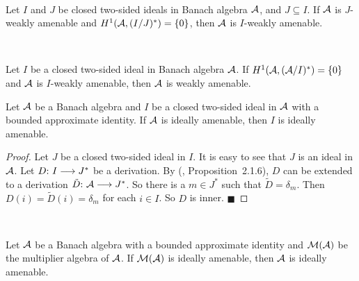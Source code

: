 \documentclass[fleqn]{mat01}
\begin{document}
\begin{coro}$\left.\right.$\vspace{.5pc}

\noindent Let $I$ and $J$ be closed two-sided ideals in Banach algebra
$\cal A${\rm ,} and $J\subseteq I$. If $\cal A$ is $J$\!-weakly amenable
and $H^1({\cal A},(I/J)^*)=\{0\}${\rm ,} then $\cal A$ is $I$-weakly
amenable.
\end{coro}

\begin{coro}$\left.\right.$\vspace{.5pc}

\noindent Let $I$ be a closed two-sided ideal in Banach algebra $\cal
A$. If $H^1({\cal A},({\cal A}/I)^*)=\{0\}$ and $\cal A$ is $I$-weakly
amenable{\rm ,} then $\cal A$ is weakly amenable.
\end{coro}

\begin{theor}[\!]
Let ${\cal A}$ be a Banach algebra and $I$ be a closed two-sided ideal
in ${\cal A}$ with a bounded approximate identity. If ${\cal A}$ is
ideally amenable{\rm ,} then $I$ is ideally amenable.
\end{theor}

\begin{proof}
Let $J$ be a closed two-sided ideal in $I$. It is easy to see that $J$
is an ideal in ${\cal A}$. Let $D\hbox{:}\ I \longrightarrow J^*$ be a
derivation. By (\cite{Ru}, Proposition~2.1.6), $D$ can be extended to a
derivation ${ \tilde D}\hbox{:}\ {\cal A} \longrightarrow J^*$. So there
is a $m \in J^*$ such that ${\tilde D}= \delta_{m}$. Then $D(i)={\tilde
D}(i)=\delta_m$ for each $i \in I$. So $D$ is inner.\hfill
$\blacksquare$
\end{proof}

\begin{coro}$\left.\right.$\vspace{.5pc}

\noindent Let ${\cal A}$ be a Banach algebra with a bounded approximate
identity and ${\cal M({\cal A})}$ be the multiplier algebra of ${\cal A}$. If
${\cal M({\cal A})}$ is ideally amenable{\rm ,} then ${\cal A}$ is ideally
amenable.
\end{coro}

\begin{defini}{\rm \cite{Gr3}}$\left.\right.$\vspace{.5pc}

\end{defini}
\end{document}
